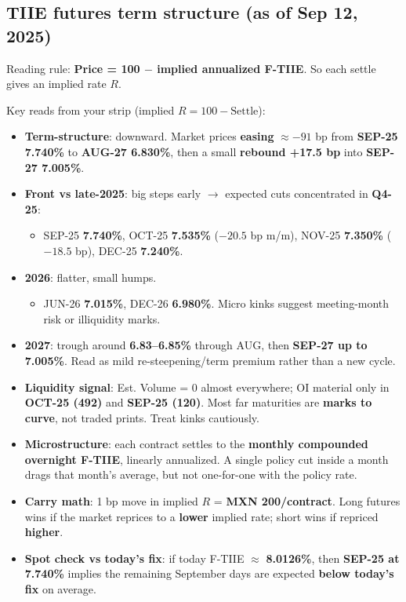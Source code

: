 \documentclass[11pt,a4paper]{article} %
\begin{document}
\subsection{TIIE futures term structure (as of Sep 12, 2025)}
Reading rule: \textbf{Price = 100 $-$ implied annualized F-TIIE}. So each settle gives an implied rate $R$.

Key reads from your strip (implied $R=100-\text{Settle}$):

\begin{itemize}
  \item \textbf{Term-structure}: downward. Market prices \textbf{easing} $\approx -91$ bp from \textbf{SEP-25 7.740\%} to \textbf{AUG-27 6.830\%}, then a small \textbf{rebound +17.5 bp} into \textbf{SEP-27 7.005\%}.
  \item \textbf{Front vs late-2025}: big steps early $\rightarrow$ expected cuts concentrated in \textbf{Q4-25}:
    \begin{itemize}
      \item SEP-25 \textbf{7.740\%}, OCT-25 \textbf{7.535\%} ($-20.5$ bp m/m), NOV-25 \textbf{7.350\%} ($-18.5$ bp), DEC-25 \textbf{7.240\%}.
    \end{itemize}
  \item \textbf{2026}: flatter, small humps.
    \begin{itemize}
      \item JUN-26 \textbf{7.015\%}, DEC-26 \textbf{6.980\%}. Micro kinks suggest meeting-month risk or illiquidity marks.
    \end{itemize}
  \item \textbf{2027}: trough around \textbf{6.83--6.85\%} through AUG, then \textbf{SEP-27 up to 7.005\%}. Read as mild re-steepening/term premium rather than a new cycle.
  \item \textbf{Liquidity signal}: Est. Volume = 0 almost everywhere; OI material only in \textbf{OCT-25 (492)} and \textbf{SEP-25 (120)}. Most far maturities are \textbf{marks to curve}, not traded prints. Treat kinks cautiously.
  \item \textbf{Microstructure}: each contract settles to the \textbf{monthly compounded overnight F-TIIE}, linearly annualized. A single policy cut inside a month drags that month’s average, but not one-for-one with the policy rate.
  \item \textbf{Carry math}: 1 bp move in implied $R$ = \textbf{MXN 200/contract}. Long futures wins if the market reprices to a \textbf{lower} implied rate; short wins if repriced \textbf{higher}.
  \item \textbf{Spot check vs today’s fix}: if today F-TIIE $\approx$ \textbf{8.0126\%}, then \textbf{SEP-25 at 7.740\%} implies the remaining September days are expected \textbf{below today’s fix} on average.
\end{itemize}
\end{document}
